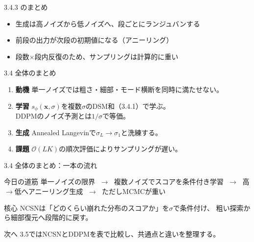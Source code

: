 \asmain
\begin{frame}{3.4.3 のまとめ}
    \begin{itemize}
        \item 生成は高ノイズから低ノイズへ、段ごとにランジュバンする
        \item 前段の出力が次段の初期値になる（アニーリング）
        \item 段数$\times$段内反復のため、サンプリングは計算的に重い
    \end{itemize}
\end{frame}
\asmain
\begin{frame}{3.4 全体のまとめ}
    \begin{enumerate}
        \item \textbf{動機}
        単一ノイズでは粗さ・細部・モード横断を同時に満たせない。
        \item \textbf{学習}
        $s_\phi(\bm{x},\sigma)$を複数$\sigma$のDSM和（3.4.1）で学ぶ。\\
        DDPMのノイズ予測とは$1/\sigma$で等価。
        \item \textbf{生成}
        Annealed Langevinで$\sigma_L\to\sigma_1$と洗練する。
        \item \textbf{課題}
        $\mathcal{O}(LK)$の順次評価によりサンプリングが遅い。
    \end{enumerate}
\end{frame}
\asmain
\begin{frame}{3.4 全体のまとめ：一本の流れ}
    \begin{block}{今日の道筋}
        単一ノイズの限界
        $\;\to\;$
        複数ノイズでスコアを条件付き学習
        $\;\to\;$
        高$\to$低へアニーリング生成
        $\;\to\;$
        ただしMCMCが重い
    \end{block}
    \begin{block}{核心}
        NCSNは「どのくらい崩れた分布のスコアか」を$\sigma$で条件付け、
        粗い探索から細部復元へ段階的に戻す。
    \end{block}
    \begin{block}{次へ}
        3.5ではNCSNとDDPMを表で比較し、共通点と違いを整理する。
    \end{block}
\end{frame}
